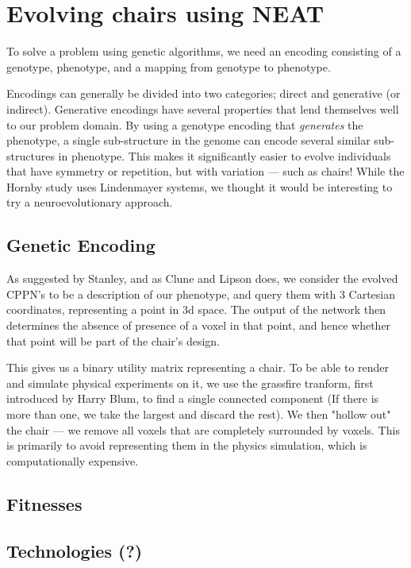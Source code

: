 \section{Evolving chairs using NEAT}
To solve a problem using genetic algorithms, we need an encoding
consisting of a genotype, phenotype, and a mapping from genotype to phenotype.

Encodings can generally be divided into two categories; direct and generative
(or indirect). Generative encodings have several properties that lend themselves
well to our problem domain. By using a genotype encoding that \textit{generates}
the phenotype, a single sub-structure in the genome can encode several similar
sub-structures in phenotype. This makes it significantly easier to evolve
individuals that have symmetry or repetition, but with variation --- such as
chairs! While the Hornby study\cite{paper:ev4} uses Lindenmayer
systems\cite{Hornby2003}, we thought it would be interesting to try a
neuroevolutionary approach.

\subsection{Genetic Encoding}
As suggested by Stanley\cite{Stanley2007}, and as Clune and
Lipson\cite{Clune:2011:EOG:2078245.2078246} does, we consider the evolved CPPN's
to be a description of our phenotype, and query them with 3 Cartesian
coordinates, representing a point in 3d space. The output of the network then
determines the absence of presence of a voxel in that point, and hence whether
that point will be part of the chair's design.

This gives us a binary utility matrix representing a chair. To be able to render
and simulate physical experiments on it, we use the grassfire tranform, first
introduced by Harry Blum\cite{blum67}, to find a single connected component (If
there is more than one, we take the largest and discard the rest). We then
"hollow out" the chair --- we remove all voxels that are completely surrounded by
voxels. This is primarily to avoid representing them in the physics simulation,
which is computationally expensive.

\subsection{Fitnesses}
\subsection{Technologies (?)}

